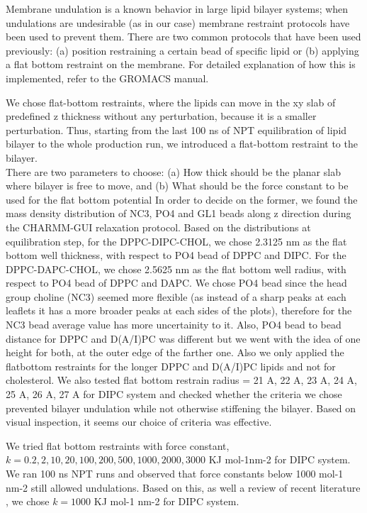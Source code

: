 \documentclass[10pt]{article}
\begin{document}
Membrane undulation is a known behavior in large lipid bilayer systems; when undulations are undesirable (as in our case) membrane restraint protocols have been used to prevent them\cite{Ingolfsson2014,Lin2019,Su2020}.
There are two common protocols that have been used previously: (a) position restraining a certain bead of specific lipid or
(b) applying a flat bottom restraint on the membrane.
For detailed explanation of how this is implemented, refer to the GROMACS manual\cite{GromacsManual}.

We chose flat-bottom restraints, where the lipids can move in the xy slab of predefined z thickness without any perturbation, because it is a smaller perturbation.
Thus, starting from the last 100 ns of NPT equilibration of lipid bilayer to the whole production run,
we introduced a flat-bottom restraint to the bilayer.\\

There are two parameters to choose: (a) How thick should be the planar slab where bilayer is free to move, and
(b) What should be the force constant to be used for the flat bottom potential
In order to decide on the former, we found the mass density distribution of NC3, PO4 and GL1 beads along z direction during the CHARMM-GUI relaxation protocol.
Based on the distributions at equilibration step, for the DPPC-DIPC-CHOL, we chose 2.3125 nm as the flat bottom well thickness, with respect to PO4 bead of DPPC and DIPC.
For the DPPC-DAPC-CHOL, we chose 2.5625 nm as the flat bottom well radius, with respect to PO4 bead of DPPC and DAPC.
We chose PO4 bead since the head group choline (NC3) seemed more flexible (as instead of a sharp peaks at each leaflets it has a more broader peaks at each sides of the plots), therefore for the NC3 bead average value has more uncertainity to it.
Also, PO4 bead to bead distance for DPPC and D(A/I)PC was different but we went with the idea of one height for both, at the outer edge of the farther one.
Also we only applied the flatbottom restraints for the longer DPPC and D(A/I)PC lipids and not for cholesterol.
We also tested flat bottom restrain radius = 21 A, 22 A, 23 A, 24 A, 25 A, 26 A, 27 A for DIPC system and checked whether the criteria we chose prevented bilayer undulation while not otherwise stiffening the bilayer.
Based on visual inspection,  it seems our choice of criteria was effective.

We tried flat bottom restraints with force constant, $k = 0.2, 2, 10, 20, 100, 200, 500, 1000, 2000, 3000$ KJ mol-1nm-2 for DIPC system.
We ran 100 ns NPT runs and observed that force constants below 1000 mol-1 nm-2 still allowed undulations. Based on this, as well a review of recent literature
\cite{Su2020}, we chose $k = 1000$ KJ mol-1 nm-2 for DIPC system.
\end{document}
